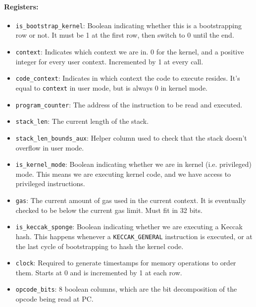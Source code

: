 \paragraph*{Registers:} \begin{itemize}
    \item \texttt{is\_bootstrap\_kernel}: Boolean indicating whether this is a bootstrapping row or not. It must be 1 at the first row, then switch to 0 until the end.
    \item \texttt{context}: Indicates which context we are in. 0 for the kernel, and a positive integer for every user context. Incremented by 1 at every call.
    \item \texttt{code\_context}: Indicates in which context the code to execute resides. It's equal to \texttt{context} in user mode, but is always 0 in kernel mode.
    \item \texttt{program\_counter}: The address of the instruction to be read and executed.
    \item \texttt{stack\_len}: The current length of the stack.
    \item \texttt{stack\_len\_bounds\_aux}: Helper column used to check that the stack doesn't overflow in user mode.
    \item \texttt{is\_kernel\_mode}: Boolean indicating whether we are in kernel (i.e. privileged) mode. This means we are executing kernel code, and we have access to
privileged instructions.
    \item \texttt{gas}: The current amount of gas used in the current context. It is eventually checked to be below the current gas limit. Must fit in 32 bits.
    \item \texttt{is\_keccak\_sponge}: Boolean indicating whether we are executing a Keccak hash. This happens whenever a \texttt{KECCAK\_GENERAL} instruction is executed, or at the last
cycle of bootstrapping to hash the kernel code.
    \item \texttt{clock}: Required to generate timestamps for memory operations to order them. Starts at 0 and is incremented by 1 at each row.
    \item \texttt{opcode\_bits}: 8 boolean columns, which are the bit decomposition of the opcode being read at PC.
\end{itemize}

